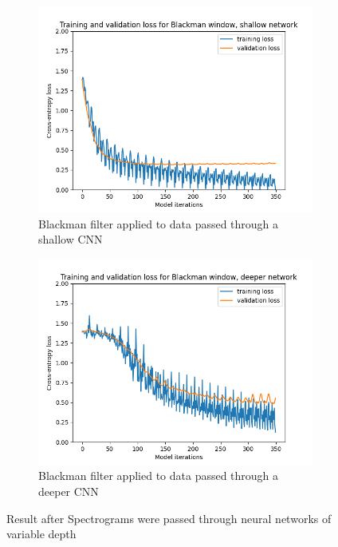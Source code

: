 \documentclass[class=report,11pt,crop=false]{standalone}
\begin{document}
\begin{figure}[hbt!]
\begin{subfigure}[b]{0.5\textwidth}
        \includegraphics[width=\linewidth]{Images/blackmanSimple.png}
        \caption{Blackman filter applied to data passed through a shallow CNN}
        \label{fig:BlackmanShallow}
    \end{subfigure}
    \hfill
    \begin{subfigure}[b]{0.5\textwidth}
        \includegraphics[width=\linewidth]{Images/blackmanComplex.png}
        \caption{Blackman filter applied to data passed through a deeper CNN}
        \label{fig:BlackmanDeeper}
    \end{subfigure}
    \caption{Result after Spectrograms were passed through neural networks of variable depth}
    \label{fig:SpecCNN}
\end{figure}
\end{document}
